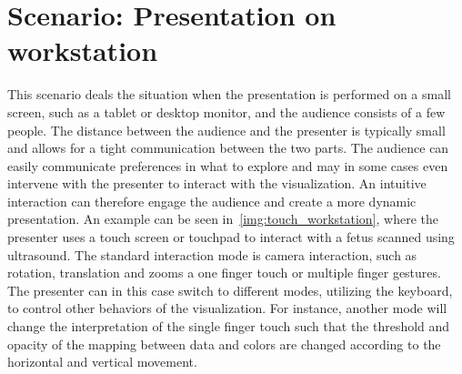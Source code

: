 \documentclass[review,journal]{vgtc}         %
\newcommand{\todo}[1]{\textbf{\textcolor{red}{[TODO: {#1}]}}}
\begin{document}
%
%

\section{Scenario: Presentation on workstation}

This scenario deals the situation when the presentation is performed on a small screen, such as a tablet or desktop monitor, and the audience consists of a few people. 
The distance between the audience and the presenter is typically small and allows for a tight communication between the two parts.
The audience can easily communicate preferences in what to explore and may in some cases even intervene with the presenter to interact with the visualization.
An intuitive interaction can therefore engage the audience and create a more dynamic presentation.
An example can be seen in~\cref{img:touch_workstation}, where the presenter uses a touch screen or touchpad to interact with a fetus scanned using ultrasound.
The standard interaction mode is camera interaction, such as rotation, translation and zooms a one finger touch or multiple finger gestures.
The presenter can in this case switch to different modes, utilizing the keyboard, to control other behaviors of the visualization.
For instance, another mode will change the interpretation of the single finger touch such that the threshold and opacity of the mapping between data and colors are changed according to the horizontal and vertical movement.

%
%
%
%
\end{document}
